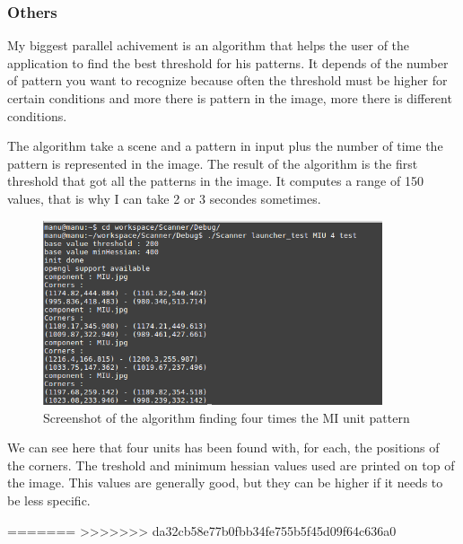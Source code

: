 \documentclass[english,a4paper,11pt]{report}
\begin{document}
	\subsubsection{Others}
	
	\par My biggest parallel achivement is an algorithm that helps the user of the application to find the best threshold for his patterns. It depends of the number of pattern you want to recognize because often the threshold must be higher for certain conditions and more there is pattern in the image, more there is different conditions. 
	\par The algorithm take a scene and a pattern in input plus the number of time the pattern is represented in the image. The result of the algorithm is the first threshold that got all the patterns in the image. It computes a range of 150 values, that is why I can take 2 or 3 secondes sometimes.
	\newpage
	\begin{figure}[t]
		\begin{center}
			\includegraphics[width=10cm]{images_not_compressed/tester.png}
			\caption{Screenshot of the algorithm finding four times the MI unit pattern}
			\label{OutIn}	
		\end{center}
	\end{figure}	
	
	\par We can see here that four units has been found with, for each, the positions of the corners. The treshold and minimum hessian values used are printed on top of the image. This values are generally good, but they can be higher if it needs to be less specific.

=======
>>>>>>> da32cb58e77b0fbb34fe755b5f45d09f64c636a0
	
	

	\clearpage

	{}
	
\end{document}
